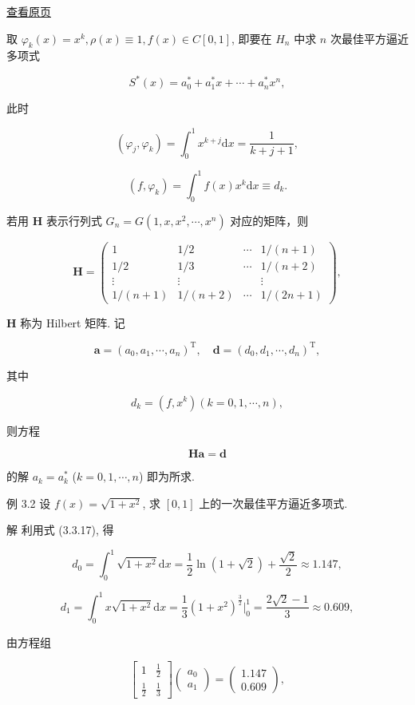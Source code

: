 \documentclass[
  10pt,
  fontset=fandol]{ctexart}
\begin{document}
\href{../../source-images/pdf-069.jpeg}{查看原页}

取 \(\varphi_k(x) = x^k, \rho(x) \equiv 1, f(x) \in C[0,1]\), 即要在 \(H_n\) 中求 \(n\) 次最佳平方逼近多项式

\[
S^*(x) = a_0^* + a_1^* x + \cdots + a_n^* x^n,
\]

此时

\[
(\varphi_j, \varphi_k) = \int_0^1 x^{k+j} \mathrm{d}x = \frac{1}{k+j+1},
\]

\[
(f, \varphi_k) = \int_0^1 f(x) x^k \mathrm{d}x \equiv d_k.
\]

若用 \(\boldsymbol{H}\) 表示行列式 \(G_n = G(1, x, x^2, \cdots, x^n)\) 对应的矩阵，则

\[\boldsymbol{H} = \begin{pmatrix}
1 & 1/2 & \cdots & 1/(n+1) \\
1/2 & 1/3 & \cdots & 1/(n+2) \\
\vdots & \vdots & & \vdots \\
1/(n+1) & 1/(n+2) & \cdots & 1/(2n+1)
\end{pmatrix}, \tag{3.3.16}
\]

\(\boldsymbol{H}\) 称为 Hilbert 矩阵. 记

\[
\boldsymbol{a} = (a_0, a_1, \cdots, a_n)^{\mathrm{T}}, \quad \boldsymbol{d} = (d_0, d_1, \cdots, d_n)^{\mathrm{T}},
\]

其中

\[
d_k = (f, x^k) (k=0, 1, \cdots, n), \tag{3.3.17}
\]

则方程

\[\boldsymbol{H}\boldsymbol{a}=\boldsymbol{d}
\]

的解 \(a_k = a_k^*\) (\(k=0, 1, \cdots, n\)) 即为所求.

例 3.2 设 \(f(x) = \sqrt{1+x^2}\), 求 \([0,1]\) 上的一次最佳平方逼近多项式.

解 利用式 (3.3.17), 得

\[
d_0 = \int_0^1 \sqrt{1+x^2} \mathrm{d}x = \frac{1}{2} \ln(1+\sqrt{2}) + \frac{\sqrt{2}}{2} \approx 1.147,
\]

\[
d_1 = \int_0^1 x \sqrt{1+x^2} \mathrm{d}x = \frac{1}{3} (1+x^2)^{\frac{3}{2}} \Bigg|_0^1 = \frac{2\sqrt{2}-1}{3} \approx 0.609,
\]

由方程组

\[
\begin{bmatrix}
1 & \frac{1}{2} \\
\frac{1}{2} & \frac{1}{3}
\end{bmatrix} \begin{pmatrix} a_0 \\ a_1 \end{pmatrix} = \begin{pmatrix} 1.147 \\ 0.609 \end{pmatrix},
\]
\end{document}

